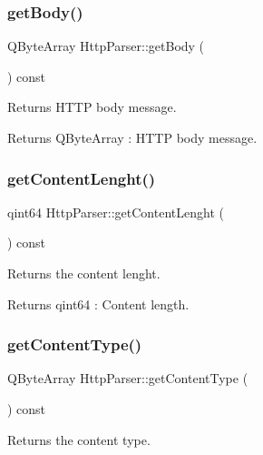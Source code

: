 \subsubsection{\texorpdfstring{get\+Body()}{getBody()}}
{\footnotesize\ttfamily Q\+Byte\+Array Http\+Parser\+::get\+Body (\begin{DoxyParamCaption}{ }\end{DoxyParamCaption}) const}



Returns H\+T\+TP body message. 

\begin{DoxyReturn}{Returns}
Q\+Byte\+Array \+: H\+T\+TP body message. 
\end{DoxyReturn}
\mbox{\label{class_http_parser_ad42f6a0ff6ab987ccf526ac995af196f}} 
\subsubsection{\texorpdfstring{get\+Content\+Lenght()}{getContentLenght()}}
{\footnotesize\ttfamily qint64 Http\+Parser\+::get\+Content\+Lenght (\begin{DoxyParamCaption}{ }\end{DoxyParamCaption}) const}



Returns the content lenght. 

\begin{DoxyReturn}{Returns}
qint64 \+: Content length. 
\end{DoxyReturn}
\mbox{\label{class_http_parser_a3adf500c4b0cf85d8249e071a7094f20}} 
\subsubsection{\texorpdfstring{get\+Content\+Type()}{getContentType()}}
{\footnotesize\ttfamily Q\+Byte\+Array Http\+Parser\+::get\+Content\+Type (\begin{DoxyParamCaption}{ }\end{DoxyParamCaption}) const}



Returns the content type. 

